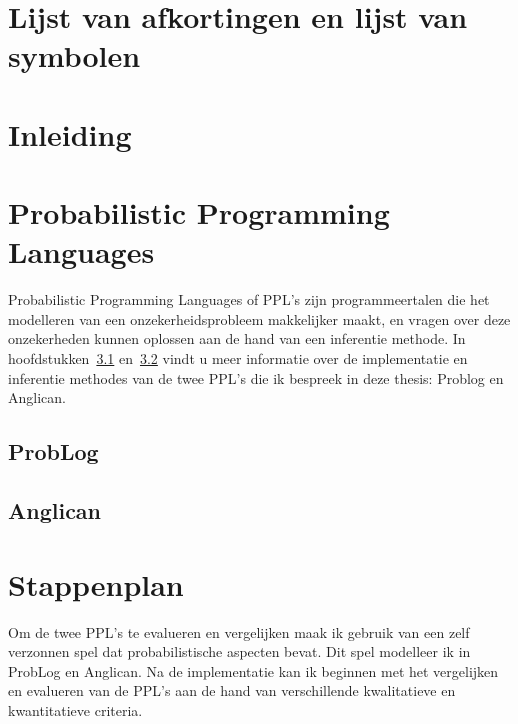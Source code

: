 \documentclass[12pt,a4paper,oneside]{book}
\begin{document}
\chapter{Lijst van afkortingen en lijst van symbolen}
\tableofcontents


\newpage
\mainmatter
\setcounter{page}{0}
\chapter{Inleiding}

\chapter{Probabilistic Programming Languages}
Probabilistic Programming Languages of PPL's zijn programmeertalen die het modelleren van een onzekerheidsprobleem makkelijker maakt, en vragen over deze onzekerheden kunnen oplossen aan de hand van een inferentie methode. In hoofdstukken~\ref{sec:problog} en~\ref{sec:anglican} vindt u meer informatie over de implementatie en inferentie methodes van de twee PPL's die ik bespreek in deze thesis: Problog en Anglican.
\section{ProbLog}
\label{sec:problog}
\section{Anglican}
\label{sec:anglican}

\chapter{Stappenplan}
Om de twee PPL's te evalueren en vergelijken maak ik gebruik van een zelf verzonnen spel dat probabilistische aspecten bevat. Dit spel modelleer ik in ProbLog en Anglican. Na de implementatie kan ik beginnen met het vergelijken en evalueren van de PPL's aan de hand van verschillende kwalitatieve en kwantitatieve criteria.
\end{document}
